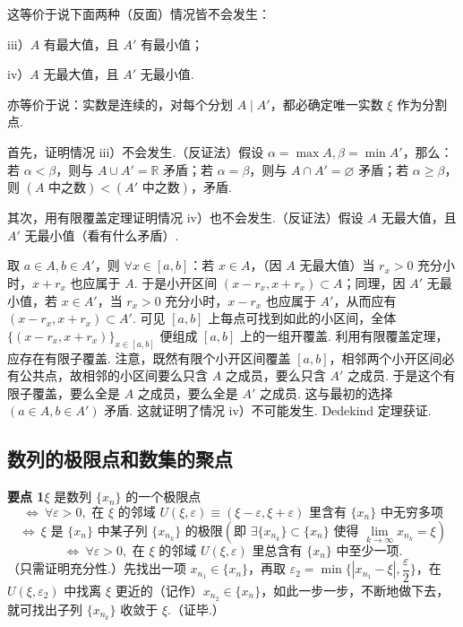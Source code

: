 \documentclass[UTF8,12pt,a4paper,fontset=fandol]{ctexart}
\begin{document}
这等价于说下面两种（反面）情况皆不会发生：

iii）$A$ 有最大值，且 $A'$ 有最小值；

iv）$A$ 无最大值，且 $A'$ 无最小值.

亦等价于说：实数是连续的，对每个分划 $A\mid A'$，都必确定唯一实数 $\xi$ 作为分割点.

首先，证明情况 iii）不会发生.（反证法）假设 $\alpha=\max A,\beta=\min A'$，那么：若 $\alpha<\beta$，则与 $A\cup A'=\mathbb{R}$ 矛盾；若 $\alpha=\beta$，则与 $A\cap A'=\varnothing$ 矛盾；若 $\alpha\ge\beta$，则 $(A\text{ 中之数})<(A'\text{ 中之数})$，矛盾.

其次，用有限覆盖定理证明情况 iv）也不会发生.（反证法）假设 $A$ 无最大值，且 $A'$ 无最小值（看有什么矛盾）.

取 $a\in A,b\in A'$，则 $\forall x\in[a,b]$：若 $x\in A$，（因 $A$ 无最大值）当 $r_x>0$ 充分小时，$x+r_x$ 也应属于 $A$. 于是小开区间 $(x-r_x,x+r_x)\subset A$；同理，因 $A'$ 无最小值，若 $x\in A'$，当 $r_x>0$ 充分小时，$x-r_x$ 也应属于 $A'$，从而应有 $(x-r_x,x+r_x)\subset A'$. 可见 $[a,b]$ 上每点可找到如此的小区间，全体 $\{(x-r_x,x+r_x)\}_{x\in[a,b]}$ 便组成 $[a,b]$ 上的一组开覆盖. 利用有限覆盖定理，应存在有限子覆盖. 注意，既然有限个小开区间覆盖 $[a,b]$，相邻两个小开区间必有公共点，故相邻的小区间要么只含 $A$ 之成员，要么只含 $A'$ 之成员. 于是这个有限子覆盖，要么全是 $A$ 之成员，要么全是 $A'$ 之成员. 这与最初的选择 $(a\in A,b\in A')$ 矛盾. 这就证明了情况 iv）不可能发生. Dedekind 定理获证.

\subsection*{数列的极限点和数集的聚点}

\noindent\textbf{要点 1}\quad $\xi$ 是数列 $\{x_n\}$ 的一个极限点
\[
\Longleftrightarrow\ \forall \varepsilon>0,\text{ 在 }\xi\text{ 的邻域 }U(\xi,\varepsilon)\equiv(\xi-\varepsilon,\xi+\varepsilon)\text{ 里含有 }\{x_n\}\text{ 中无穷多项}
\]
\[
\Longleftrightarrow\ \xi\text{ 是 }\{x_n\}\text{ 中某子列 }\{x_{n_k}\}\text{ 的极限}\left(\text{即 }\exists\{x_{n_k}\}\subset\{x_n\}\text{ 使得 }\lim_{k\to\infty}x_{n_k}=\xi\right)
\]
\[
\Longleftrightarrow\ \forall \varepsilon>0,\text{ 在 }\xi\text{ 的邻域 }U(\xi,\varepsilon)\text{ 里总含有 }\{x_n\}\text{ 中至少一项}.
\]
（只需证明充分性.）先找出一项 $x_{n_1}\in\{x_n\}$，再取 $\varepsilon_2=\min\{|x_{n_1}-\xi|,\dfrac\varepsilon2\}$，在 $U(\xi,\varepsilon_2)$ 中找离 $\xi$ 更近的（记作）$x_{n_2}\in\{x_n\}$，如此一步一步，不断地做下去，就可找出子列 $\{x_{n_k}\}$ 收敛于 $\xi$.（证毕.）
\end{document}

